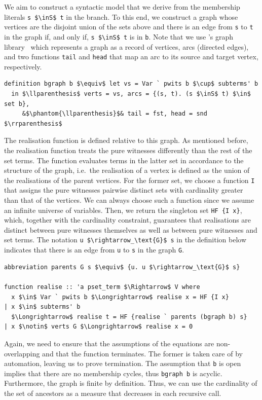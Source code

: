 \documentclass[runningheads]{llncs}
\newcommand{\inS}{\in_\text{s}}
\begin{document}
We aim to construct a syntactic model that we derive from the membership literals \lstinline!s $\inS$ t! in the branch.
To this end, we construct a graph whose vertices are the disjoint union of the sets above and there is an edge from \lstinline!s! to \lstinline!t! in the graph if, and only if, \lstinline!s $\inS$ t! is in \lstinline!b!.
Note that we use \citeauthor{graph_theory_afp}'s graph library~\cite{graph_theory_afp} which represents a graph as a record of vertices, arcs (directed edges), and two functions \lstinline!tail! and \lstinline!head! that map an arc to its source and target vertex, respectively.
\begin{lstlisting}
definition bgraph b $\equiv$ let vs = Var ` pwits b $\cup$ subterms' b
  in $\llparenthesis$ verts = vs, arcs = {(s, t). (s $\inS$ t) $\in$ set b},
     &$\phantom{\llparenthesis}$& tail = fst, head = snd $\rrparenthesis$
\end{lstlisting}

The realisation function is defined relative to this graph.
As mentioned before, the realisation function treats the pure witnesses differently than the rest of the set terms.
The function evaluates terms in the latter set in accordance to the structure of the graph, i.e.\ the realisation of a vertex is defined as the union of the realisations of the parent vertices. 
For the former set, we choose a function \lstinline!I! that assigns the pure witnesses pairwise distinct sets with cardinality greater than that of the vertices.
We can always choose such a function since we assume an infinite universe of variables.
Then, we return the singleton set \lstinline!HF {I x}!, which, together with the cardinality constraint, guarantees that realisations are distinct between pure witnesses themselves as well as between pure witnesses and set terms.  
The notation \lstinline!u $\rightarrow_\text{G}$ s! in the definition below indicates that there is an edge from \lstinline!u! to \lstinline!s! in the graph \lstinline!G!.
\begin{lstlisting}
abbreviation parents G s $\equiv$ {u. u $\rightarrow_\text{G}$ s}

function realise :: 'a pset_term $\Rightarrow$ V where
  x $\in$ Var ` pwits b $\Longrightarrow$ realise x = HF {I x}
| x $\in$ subterms' b
  $\Longrightarrow$ realise t = HF {realise ` parents (bgraph b) s}
| x $\notin$ verts G $\Longrightarrow$ realise x = 0
\end{lstlisting}

Again, we need to ensure that the assumptions of the equations are non-overlapping and that the function terminates.
The former is taken care of by automation, leaving us to prove termination.
The assumption that \lstinline!b! is open implies that there are no membership cycles, thus \lstinline!bgraph b! is acyclic.
Furthermore, the graph is finite by definition.
Thus, we can use the cardinality of the set of ancestors as a measure that decreases in each recursive call.
\end{document}
